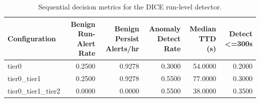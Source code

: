 \begin{table}[t]
\centering
\caption{Sequential decision metrics for the DICE run-level detector.}
\label{tab:dice_sequential_metrics}
\footnotesize
\begin{tabular}{lrrrrr}
\toprule
Configuration & Benign Run-Alert Rate & Benign Persist Alerts/hr & Anomaly Detect Rate & Median TTD (s) & Detect <=300s \\
\midrule
tier0 & 0.2500 & 0.9278 & 0.3000 & 54.0000 & 0.2000 \\
tier0_tier1 & 0.2500 & 0.9278 & 0.5500 & 77.0000 & 0.3000 \\
tier0_tier1_tier2 & 0.0000 & 0.0000 & 0.5500 & 38.0000 & 0.3500 \\
\bottomrule
\end{tabular}

\end{table}
